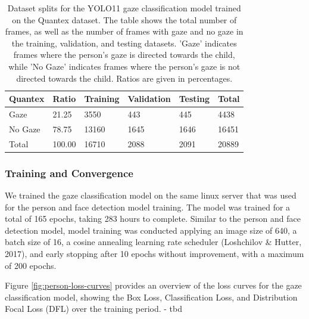 \documentclass[
  man,floatsintext]{apa6}
\begin{document}
\begin{table}[tbp]

\begin{center}
\begin{threeparttable}

\caption{\label{tab:gaze-dataset-splits}Dataset splits for the YOLO11 gaze classification model trained on the Quantex dataset. The table shows the total number of frames, as well as the number of frames with gaze and no gaze in the training, validation, and testing datasets. 'Gaze' indicates frames where the person's gaze is directed towards the child, while 'No Gaze' indicates frames where the person's gaze is not directed towards the child. Ratios are given in percentages.}

\begin{tabular}{llllll}
\toprule
Quantex & \multicolumn{1}{c}{Ratio} & \multicolumn{1}{c}{Training} & \multicolumn{1}{c}{Validation} & \multicolumn{1}{c}{Testing} & \multicolumn{1}{c}{Total}\\
\midrule
Gaze & 21.25 & 3550 & 443 & 445 & 4438\\
No Gaze & 78.75 & 13160 & 1645 & 1646 & 16451\\
Total & 100.00 & 16710 & 2088 & 2091 & 20889\\
\bottomrule
\end{tabular}

\end{threeparttable}
\end{center}

\end{table}

\subsubsection{Training and Convergence}\label{training-and-convergence-1}

We trained the gaze classification model on the same linux server that was used for the person and face detection model training. The model was trained for a total of 165 epochs, taking 283 hours to complete. Similar to the person and face detection model, model training was conducted applying an image size of 640, a batch size of 16, a cosine annealing learning rate scheduler (Loshchilov \& Hutter, 2017), and early stopping after 10 epochs without improvement, with a maximum of 200 epochs.

Figure \ref{fig:person-loss-curves} provides an overview of the loss curves for the gaze classification model, showing the Box Loss, Classification Loss, and Distribution Focal Loss (DFL) over the training period.
- tbd
\end{document}

